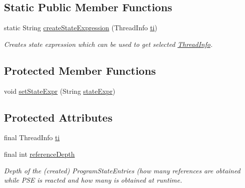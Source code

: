 \subsection*{Static Public Member Functions}
\begin{DoxyCompactItemize}
\item 
static String \hyperlink{classgov_1_1nasa_1_1jpf_1_1inspector_1_1server_1_1programstate_1_1_state_thread_info_a800625c00d06b5435a68d63f4602375e}{create\+State\+Expression} (Thread\+Info \hyperlink{classgov_1_1nasa_1_1jpf_1_1inspector_1_1server_1_1programstate_1_1_state_thread_info_a62ec5520eec2d112a5669f0b845bf915}{ti})
\begin{DoxyCompactList}\small\item\em Creates state expression which can be used to get selected \hyperlink{}{Thread\+Info}. \end{DoxyCompactList}\end{DoxyCompactItemize}
\subsection*{Protected Member Functions}
\begin{DoxyCompactItemize}
\item 
void \hyperlink{classgov_1_1nasa_1_1jpf_1_1inspector_1_1server_1_1programstate_1_1_state_node_a7ed75cc4ba543123c95e506db6f7b84c}{set\+State\+Expr} (String \hyperlink{classgov_1_1nasa_1_1jpf_1_1inspector_1_1server_1_1programstate_1_1_state_node_a784a38d8edeb54f871891cb63de85585}{state\+Expr})
\end{DoxyCompactItemize}
\subsection*{Protected Attributes}
\begin{DoxyCompactItemize}
\item 
final Thread\+Info \hyperlink{classgov_1_1nasa_1_1jpf_1_1inspector_1_1server_1_1programstate_1_1_state_thread_info_a62ec5520eec2d112a5669f0b845bf915}{ti}
\item 
final int \hyperlink{classgov_1_1nasa_1_1jpf_1_1inspector_1_1server_1_1programstate_1_1_state_node_a55683618625dae46e8aa68d95811d6bb}{reference\+Depth}
\begin{DoxyCompactList}\small\item\em Depth of the (created) Program\+State\+Entries (how many references are obtained while P\+SE is reacted and how many is obtained at runtime. \end{DoxyCompactList}\end{DoxyCompactItemize}


